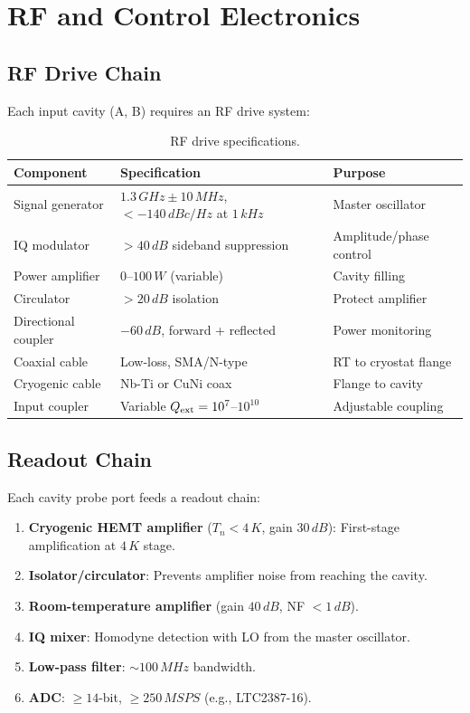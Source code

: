 \documentclass[12pt,a4paper]{article}
\begin{document}
\section{RF and Control Electronics}

\subsection{RF Drive Chain}

Each input cavity (A, B) requires an RF drive system:

\begin{table}[H]
\centering
\caption{RF drive specifications.}
\begin{tabular}{lll}
\toprule
\textbf{Component} & \textbf{Specification} & \textbf{Purpose} \\
\midrule
Signal generator & $1.3\,\si{GHz} \pm 10\,\si{MHz}$, $< -140\,\si{dBc/Hz}$ at $1\,\si{kHz}$ & Master oscillator \\
IQ modulator & $> 40\,\si{dB}$ sideband suppression & Amplitude/phase control \\
Power amplifier & $0$--$100\,\si{W}$ (variable) & Cavity filling \\
Circulator & $> 20\,\si{dB}$ isolation & Protect amplifier \\
Directional coupler & $-60\,\si{dB}$, forward + reflected & Power monitoring \\
Coaxial cable & Low-loss, SMA/N-type & RT to cryostat flange \\
Cryogenic cable & Nb-Ti or CuNi coax & Flange to cavity \\
Input coupler & Variable $Q_{\rm ext} = 10^7$--$10^{10}$ & Adjustable coupling \\
\bottomrule
\end{tabular}
\end{table}

\subsection{Readout Chain}

Each cavity probe port feeds a readout chain:

\begin{enumerate}
\item \textbf{Cryogenic HEMT amplifier} ($T_n < 4\,\si{K}$, gain $30\,\si{dB}$): First-stage amplification at $4\,\si{K}$ stage.
\item \textbf{Isolator/circulator}: Prevents amplifier noise from reaching the cavity.
\item \textbf{Room-temperature amplifier} (gain $40\,\si{dB}$, NF $< 1\,\si{dB}$).
\item \textbf{IQ mixer}: Homodyne detection with LO from the master oscillator.
\item \textbf{Low-pass filter}: $\sim 100\,\si{MHz}$ bandwidth.
\item \textbf{ADC}: $\geq 14$-bit, $\geq 250\,\si{MSPS}$ (e.g., LTC2387-16).
\end{enumerate}
\end{document}
